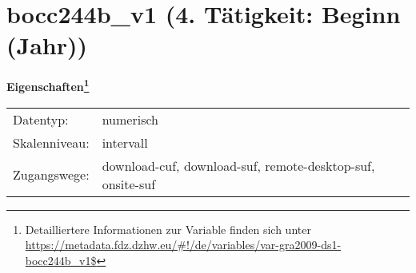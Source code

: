
    \setcounter{footnote}{0}

    \vspace*{-1.8cm}
	\section{bocc244b\_v1 (4. Tätigkeit: Beginn (Jahr))}
	\label{section:bocc244b_v1}



    \vspace*{0.5cm}
    \noindent\textbf{Eigenschaften\footnote{Detailliertere Informationen zur Variable finden sich unter
		\url{https://metadata.fdz.dzhw.eu/\#!/de/variables/var-gra2009-ds1-bocc244b_v1$}}}\\
	\begin{tabularx}{\hsize}{@{}lX}
	Datentyp: & numerisch \\
	Skalenniveau: & intervall \\
	Zugangswege: &
	  download-cuf, 
	  download-suf, 
	  remote-desktop-suf, 
	  onsite-suf
 \\
    \end{tabularx}



